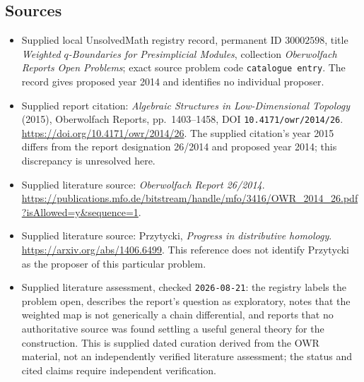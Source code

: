 \documentclass[11pt]{article}
\begin{document}
\subsection{Sources}
\begin{itemize}
\item Supplied local UnsolvedMath registry record, permanent ID \(30002598\), title \emph{Weighted \(q\)-Boundaries for Presimplicial Modules}, collection \emph{Oberwolfach Reports Open Problems}; exact source problem code \texttt{catalogue entry}. The record gives proposed year 2014 and identifies no individual proposer.
\item Supplied report citation: \emph{Algebraic Structures in Low-Dimensional Topology} (2015), Oberwolfach Reports, pp.\ 1403--1458, DOI \texttt{10.4171/owr/2014/26}. \url{https://doi.org/10.4171/owr/2014/26}. The supplied citation's year 2015 differs from the report designation 26/2014 and proposed year 2014; this discrepancy is unresolved here.
\item Supplied literature source: \emph{Oberwolfach Report 26/2014}. \url{https://publications.mfo.de/bitstream/handle/mfo/3416/OWR_2014_26.pdf?isAllowed=y&sequence=1}.
\item Supplied literature source: Przytycki, \emph{Progress in distributive homology}. \url{https://arxiv.org/abs/1406.6499}. This reference does not identify Przytycki as the proposer of this particular problem.
\item Supplied literature assessment, checked \texttt{2026-08-21}: the registry labels the problem open, describes the report's question as exploratory, notes that the weighted map is not generically a chain differential, and reports that no authoritative source was found settling a useful general theory for the construction. This is supplied dated curation derived from the OWR material, not an independently verified literature assessment; the status and cited claims require independent verification.
\end{itemize}
\end{document}
